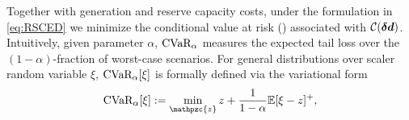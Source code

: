 %
Together with generation and reserve capacity costs, under the \RSCED{} formulation in \eqref{eq:RSCED} we minimize the conditional value at risk (\CVaR{}) associated with ${\cal C}({\bm{\delta d}})$. Intuitively, given parameter $\alpha$, ${\textrm{CVaR}}{}_{\alpha}$
measures the expected tail loss over the $(1-\alpha)$-fraction of worst-case scenarios. For general distributions over scaler random variable $\xi$, ${\textrm{CVaR}}{}_{\alpha}[\xi]$ is formally defined via the variational form
\begin{equation}\label{eq:CVaR_var}
    \cvar[\alpha]{\xi} := \min_{\mathpzc{z}} z + \frac{1}{1 - \alpha} \mathbb{E}[ \xi - z ]^+,
\end{equation}
